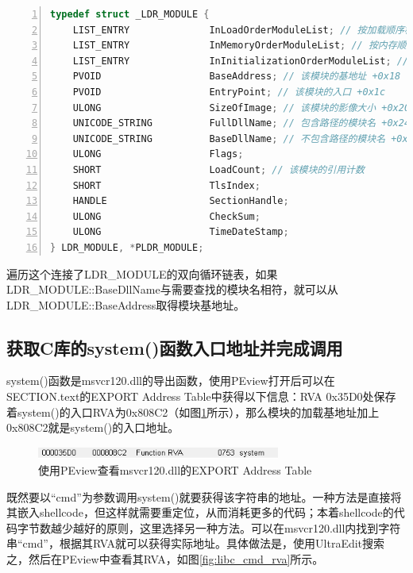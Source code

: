 \documentclass[bachelor]{thesis-uestc}
\begin{document}
\begin{lstlisting}[language=C++, basicstyle=\ttfamily\tiny, numbers=left, numberstyle=\tiny, keywordstyle=\color{blue!70}, commentstyle=\color{red!50!green!50!blue!50}, frame=shadowbox, rulesepcolor=\color{red!20!green!20!blue!20}]
typedef struct _LDR_MODULE {
	LIST_ENTRY              InLoadOrderModuleList; // 按加载顺序构成的模块链表 +0x00
	LIST_ENTRY              InMemoryOrderModuleList; // 按内存顺序构成的模块链表 +0x08
	LIST_ENTRY              InInitializationOrderModuleList; // 按初始化顺序构成的模块链表 +0x10
	PVOID                   BaseAddress; // 该模块的基地址 +0x18
	PVOID                   EntryPoint; // 该模块的入口 +0x1c
	ULONG                   SizeOfImage; // 该模块的影像大小 +0x20
	UNICODE_STRING          FullDllName; // 包含路径的模块名 +0x24
	UNICODE_STRING          BaseDllName; // 不包含路径的模块名 +0x28
	ULONG                   Flags;
	SHORT                   LoadCount; // 该模块的引用计数
	SHORT                   TlsIndex;
	HANDLE                  SectionHandle;
	ULONG                   CheckSum;
	ULONG                   TimeDateStamp;
} LDR_MODULE, *PLDR_MODULE;
\end{lstlisting}

遍历这个连接了LDR\_MODULE的双向循环链表，如果LDR\_MODULE::BaseDllName与需要查找的模块名相符，就可以从LDR\_MODULE::BaseAddress取得模块基地址。

\subsection{获取C库的system()函数入口地址并完成调用}
system()函数是msvcr120.dll的导出函数，使用PEview打开后可以在SECTION.text的EXPORT Address Table中获得以下信息：RVA 0x35D0处保存着system()的入口RVA为0x808C2（如图\ref{fig:libc_system_rva}所示），那么模块的加载基地址加上0x808C2就是system()的入口地址。

\begin{figure}[htbp]
	\centering\includegraphics[width=8cm]{images/libc_system_rva.png}
	\caption{使用PEview查看msvcr120.dll的EXPORT Address Table}
	\label{fig:libc_system_rva}
\end{figure}

既然要以``cmd''为参数调用system()就要获得该字符串的地址。一种方法是直接将其嵌入shellcode，但这样就需要重定位，从而消耗更多的代码；本着shellcode的代码字节数越少越好的原则，这里选择另一种方法。可以在msvcr120.dll内找到字符串``cmd''，根据其RVA就可以获得实际地址。具体做法是，使用UltraEdit搜索之，然后在PEview中查看其RVA，如图\ref{fig:libc_cmd_rva}所示。
\end{document}
